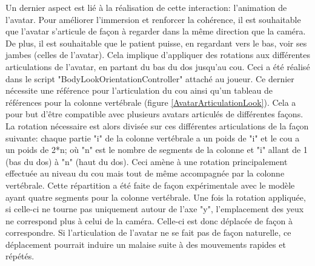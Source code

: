 		Un dernier aspect est lié à la réalisation de cette interaction: l'animation de l'avatar. Pour améliorer l'immersion et renforcer la cohérence, il est souhaitable que l'avatar s'articule de façon à regarder dans la même direction que la caméra.
		De plus, il est souhaitable que le patient puisse, en regardant vers le bas, voir ses jambes (celles de l'avatar). Cela implique d'appliquer des rotations aux différentes articulations de l'avatar, en partant du bas du dos jusqu'au cou. Ceci a été réalisé dans le script "BodyLookOrientationController" attaché au joueur. Ce dernier nécessite une référence pour l'articulation du cou ainsi qu'un tableau de références pour la colonne vertébrale (figure \ref{AvatarArticulationLook}). Cela a pour but d'être compatible avec plusieurs avatars articulés de différentes façons. La rotation nécessaire est alors divisée sur ces différentes articulations de la façon suivante: chaque partie "i" de la colonne vertébrale a un poids de "i" et le cou a un poids de 2*n; où "n" est le nombre de segments de la colonne et "i" allant de 1 (bas du dos) à "n" (haut du dos). %
		Ceci amène à une rotation principalement effectuée au niveau du cou mais tout de même accompagnée par la colonne vertébrale. Cette répartition a été faite de façon expérimentale avec le modèle ayant quatre segments pour la colonne vertébrale. Une fois la rotation appliquée, si celle-ci ne tourne pas uniquement autour de l'axe "y", l'emplacement des yeux ne correspond plus à celui de la caméra. Celle-ci est donc déplacée de façon à correspondre. Si l'articulation de l'avatar ne se fait pas de façon naturelle, ce déplacement pourrait induire un malaise suite à des mouvements rapides et répétés.
		\medskip
		
		\begin{minipage}{\linewidth}
			\label{AvatarArticulationLook}
		\end{minipage}\medskip	
		
